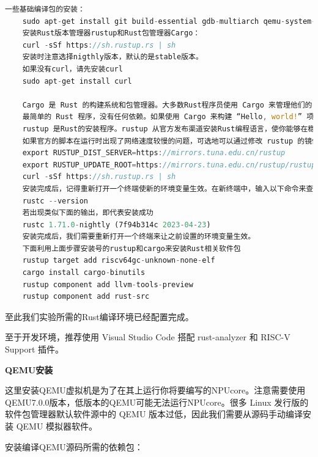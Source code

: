 \begin{lstlisting}[language={Rust}, label={code:forktest},
	caption={forktest.rs}]
	一些基础编译包的安装：
	sudo apt-get install git build-essential gdb-multiarch qemu-system-misc gcc-riscv64-linux-gnu binutils-riscv64-linux-gnu
	安装Rust版本管理器rustup和Rust包管理器Cargo：
	curl -sSf https://sh.rustup.rs | sh 
	安装时注意选择nigthly版本，默认的是stable版本。
	如果没有curl，请先安装curl
	sudo apt-get install curl
	
	Cargo 是 Rust 的构建系统和包管理器。大多数Rust程序员使用 Cargo 来管理他们的 Rust 项目，因为它可以为你处理很多任务，比如构建代码、下载依赖库并编译这些库。（我们把代码所需要的库叫做依赖（dependencies））。
	最简单的 Rust 程序，没有任何依赖。如果使用 Cargo 来构建 “Hello, world!” 项目，将只会用到 Cargo 构建代码的那部分功能。在编写更复杂的 Rust 程序时，你将添加依赖项，如果使用 Cargo 启动项目，则添加依赖项将更容易。
	rustup 是Rust的安装程序。rustup 从官方发布渠道安装Rust编程语言，使你能够在稳定版、测试版和nightly编译器之间轻松切换并保持更新。它使交叉编译变得更加简单，为普通平台的标准库建立二进制。而且它可以在Rust支持的所有平台上运行。
	如果官方的脚本在运行时出现了网络速度较慢的问题，可选地可以通过修改 rustup 的镜像地址（修改为清华大学的镜像服务器）来加速：
	export RUSTUP_DIST_SERVER=https://mirrors.tuna.edu.cn/rustup
	export RUSTUP_UPDATE_ROOT=https://mirrors.tuna.edu.cn/rustup/rustup
	curl -sSf https://sh.rustup.rs | sh
	安装完成后，记得重新打开一个终端使新的环境变量生效。在新终端中，输入以下命令来查看安装的rustup的版本，以验证是否成功安装：
	rustc --version
	若出现类似下面的输出，即代表安装成功
	rustc 1.71.0-nightly (7f94b314c 2023-04-23)
	安装完成后，我们需要重新打开一个终端来让之前设置的环境变量生效。
	下面利用上面步骤安装号的rustup和cargo来安装Rust相关软件包
	rustup target add riscv64gc-unknown-none-elf
	cargo install cargo-binutils 
	rustup component add llvm-tools-preview
	rustup component add rust-src
\end{lstlisting}

至此我们实验所需的Rust编译环境已经配置完成。

至于开发环境，推荐使用 Visual Studio Code 搭配 rust-analyzer 和 RISC-V Support 插件。

\textbf{QEMU安装}

这里安装QEMU虚拟机是为了在其上运行你将要编写的NPUcore。注意需要使用QEMU7.0.0版本，低版本的QEMU可能无法运行NPUcore。很多 Linux 发行版的软件包管理器默认软件源中的 QEMU 版本过低，因此我们需要从源码手动编译安装 QEMU 模拟器软件。

安装编译QEMU源码所需的依赖包：

